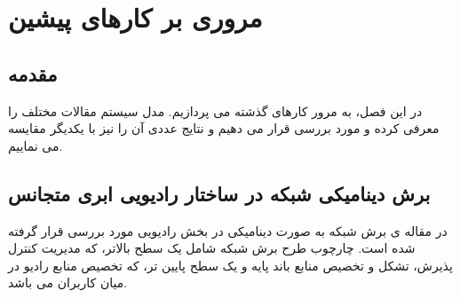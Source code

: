 \chapter{مروری بر کارهای پیشین}

\section{مقدمه}
در این فصل، به مرور کارهای گذشته می پردازیم.
مدل سیستم مقالات مختلف را معرفی کرده و مورد بررسی قرار می دهیم و نتایج عددی آن را نیز با یکدیگر مقایسه می نماییم.
\section{برش دینامیکی شبکه در ساختار رادیویی ابری متجانس}
در مقاله ی \cite{lee2018dynamic}
برش شبکه به صورت دینامیکی در بخش رادیویی مورد بررسی قرار گرفته شده است.
چارچوب طرح برش شبکه شامل یک سطح بالاتر، که مدیریت کنترل پذیرش، تشکل و تخصیص منابع باند پایه و یک سطح پایین تر، که تخصیص منابع رادیو در میان کاربران می باشد.
